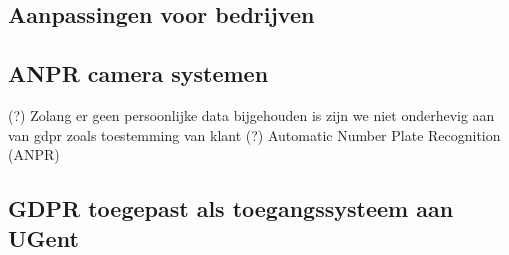 \subsection{Aanpassingen voor bedrijven}

\subsection{ANPR camera systemen}
\label{anpr-cameras}

(?) Zolang er geen persoonlijke data bijgehouden is zijn we niet onderhevig aan van gdpr zoals toestemming van klant (?)
Automatic Number Plate Recognition (ANPR)

\subsection{GDPR toegepast als toegangssysteem aan UGent}